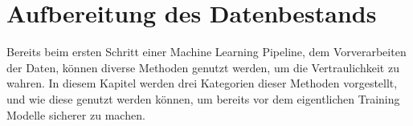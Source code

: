 \section{Aufbereitung des Datenbestands}\label{sec:aufbereitung_datensatz}

Bereits beim ersten Schritt einer Machine Learning Pipeline, dem Vorverarbeiten der Daten, können diverse Methoden genutzt werden, um die Vertraulichkeit zu wahren.
In diesem Kapitel werden drei Kategorien dieser Methoden vorgestellt, und wie diese genutzt werden können, um bereits vor dem eigentlichen Training Modelle sicherer zu machen.



